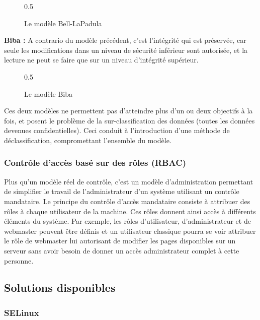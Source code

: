 \begin{figure}[h]
	\centering
	{0.5}
	\caption{Le modèle Bell-LaPadula}
\end{figure}

\textbf{Biba :} A contrario du modèle précédent, c'est l'intégrité qui est préservée, car seule les modifications dans un niveau de sécurité inférieur sont autorisée, et la lecture ne peut se faire que sur un niveau d'intégrité supérieur.

\begin{figure}[h]
	\centering
	{0.5}
	\caption{Le modèle Biba}
\end{figure}

Ces deux modèles ne permettent pas d'atteindre plus d'un ou deux objectifs à la fois, et posent le problème de la sur-classification des données (toutes les données devenues confidentielles). Ceci conduit à l'introduction d'une méthode de déclassification, compromettant l'ensemble du modèle.

\subsubsection{Contrôle d'accès basé sur des rôles (RBAC)}

Plus qu'un modèle réel de contrôle, c'est un modèle d'administration permettant de simplifier le travail de l'administrateur d'un système utilisant un contrôle mandataire. Le principe du contrôle d'accès mandataire consiste à attribuer des rôles à chaque utilisateur de la machine. Ces rôles donnent ainsi accès à différents éléments du système. Par exemple, les rôles d'utilisateur, d'administrateur et de webmaster peuvent être définis et un utilisateur classique pourra se voir attribuer le rôle de webmaster lui autorisant de modifier les pages disponibles sur un serveur sans avoir besoin de donner un accès administrateur complet à cette personne.

\subsection{Solutions disponibles}

\subsubsection{SELinux}


